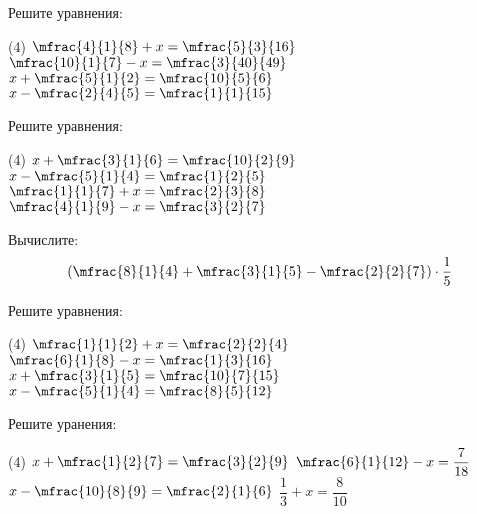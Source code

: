 %
%

\begin{class}[number=1]
	\begin{listofex}
		\item Решите уравнения:
		\begin{tasks}(4)
			\task \( \mfrac{4}{1}{8}+x=\mfrac{5}{3}{16} \)
			\task \( \mfrac{10}{1}{7}-x=\mfrac{3}{40}{49} \)
			\task \( x+\mfrac{5}{1}{2}=\mfrac{10}{5}{6} \)
			\task \( x-\mfrac{2}{4}{5}=\mfrac{1}{1}{15} \)
		\end{tasks}
		\item Решите уравнения:
		\begin{tasks}(4)
			\task \( x+\mfrac{3}{1}{6}=\mfrac{10}{2}{9} \)
			\task \( x-\mfrac{5}{1}{4}=\mfrac{1}{2}{5} \)
			\task \( \mfrac{1}{1}{7}+x=\mfrac{2}{3}{8} \)
			\task \( \mfrac{4}{1}{9}-x=\mfrac{3}{2}{7} \)
		\end{tasks}
		\item Вычислите: 
		\[ \left( \mfrac{8}{1}{4}+\mfrac{3}{1}{5}-\mfrac{2}{2}{7}  \right)\cdot\dfrac{1}{5}\]
	\end{listofex}
\end{class}

\begin{homework}[number=1]
	\begin{listofex}
		\item Решите уравнения:
		\begin{tasks}(4)
			\task \( \mfrac{1}{1}{2}+x=\mfrac{2}{2}{4} \)
			\task \( \mfrac{6}{1}{8}-x=\mfrac{1}{3}{16} \)
			\task \( x+\mfrac{3}{1}{5}=\mfrac{10}{7}{15} \)
			\task \( x-\mfrac{5}{1}{4}=\mfrac{8}{5}{12} \)
		\end{tasks}
		\item Решите уранения:
		\begin{tasks}(4)
			\task \( x+\mfrac{1}{2}{7}=\mfrac{3}{2}{9} \)
			\task \( \mfrac{6}{1}{12}-x=\dfrac{7}{18} \)
			\task \( x-\mfrac{10}{8}{9}=\mfrac{2}{1}{6} \)
			\task \( \dfrac{1}{3}+x=\dfrac{8}{10} \)
		\end{tasks}
	\end{listofex}
\end{homework}

